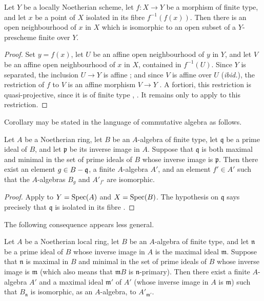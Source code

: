 \begin{corollary}[4.4.5]
\label{III.4.4.5}
Let $Y$ be a locally Noetherian scheme, let $f:X\to Y$ be a morphism
of finite type, and let $x$ be a point of $X$ isolated in its fibre
$f^{-1}(f(x))$.  Then there is an open neighbourhood of $x$ in $X$
which is isomorphic to an open subset of a $Y$-prescheme finite over
$Y$.
\end{corollary}

\begin{proof}
Set $y=f(x)$, let $U$ be an affine open neighbourhood of $y$ in $Y$,
and let $V$ be an affine open neighbourhood of $x$ in $X$, contained
in $f^{-1}(U)$.  Since $Y$ is separated, the inclusion $U\to Y$ is
affine ; and since $V$ is affine over $U$
(\emph{ibid.}), the restriction of $f$ to $V$ is an affine morphism
$V\to Y$ .  A fortiori, this restriction is
quasi-projective, since it is of finite type
, .  It remains only to apply
 to this restriction.
\end{proof}

Corollary  may be stated in the language of
commutative algebra as follows.

\begin{corollary}[4.4.6]
\label{III.4.4.6}
Let $A$ be a Noetherian ring, let $B$ be an $A$-algebra of finite
type, let $\mathfrak q$ be a prime ideal of $B$, and let $\mathfrak p$
be its inverse image in $A$.  Suppose that $\mathfrak q$ is both
maximal and minimal in the set of prime ideals of $B$ whose inverse
image is $\mathfrak p$.  Then there exist an element
$g\in B-\mathfrak q$, a finite $A$-algebra $A'$, and an element
$f'\in A'$ such that the $A$-algebras $B_g$ and $A'_{f'}$ are
isomorphic.
\end{corollary}

\begin{proof}
Apply  to $Y=\operatorname{Spec}(A)$ and $X=\operatorname{Spec}(B)$.  The
hypothesis on $\mathfrak q$ says precisely that $\mathfrak q$ is
isolated in its fibre .
\end{proof}

The following consequence appears less general.


\begin{corollary}[4.4.7]
\label{III.4.4.7}
Let $A$ be a Noetherian local ring, let $B$ be an $A$-algebra of
finite type, and let $\mathfrak n$ be a prime ideal of $B$ whose
inverse image in $A$ is the maximal ideal $\mathfrak m$.  Suppose
that $\mathfrak n$ is maximal in $B$ and minimal in the set of prime
ideals of $B$ whose inverse image is $\mathfrak m$ (which also means
that $\mathfrak mB$ is $\mathfrak n$-primary).  Then there exist a
finite $A$-algebra $A'$ and a maximal ideal $\mathfrak m'$ of $A'$
(whose inverse image in $A$ is $\mathfrak m$) such that $B_{\mathfrak
n}$ is isomorphic, as an $A$-algebra, to $A'_{\mathfrak m'}$.
\end{corollary}

